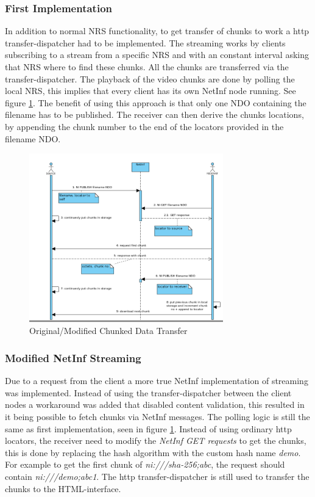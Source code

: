 \subsubsection{First Implementation}
In addition to normal NRS functionality, to get transfer of chunks to work a http transfer-dispatcher had to be implemented. The streaming works by clients subscribing to a stream from a specific NRS and with an constant interval  asking that NRS where to find these chunks. All the chunks are transferred via the transfer-dispatcher.
The playback of the video chunks are done by polling the local NRS, this implies that every client has its own NetInf node running. See figure \ref{fig:stream-seqorgmod}. The benefit of using this approach is that only one NDO containing the filename has to be published. The receiver can then derive the chunks locations, by appending the chunk number to the end of the locators provided in the filename NDO.

\begin{figure}[h!]
	\centering
		\includegraphics[width=0.75\textwidth]{./img/sequence_diagram_streaming_orgmod.png}
    	\caption{Original/Modified Chunked Data Transfer}
	\label{fig:stream-seqorgmod}
\end{figure}

\subsubsection{Modified NetInf Streaming}
Due to a request from the client a more true NetInf implementation of streaming was implemented. Instead of using the transfer-dispatcher between the client nodes a workaround was added that disabled content validation, this resulted in it being possible to fetch chunks via NetInf messages. The polling logic is still the same as first implementation, seen in figure \ref{fig:stream-seqorgmod}. Instead of using ordinary http locators, the receiver need to modify the \textit{NetInf GET requests} to get the chunks, this is done by replacing the hash algorithm with the custom hash name \textit{demo}. For example to get the first chunk of \textit{ni:///sha-256;abc}, the request should contain \textit{ni:///demo;abc1}. The http transfer-dispatcher is still used to transfer the chunks to the HTML-interface.

